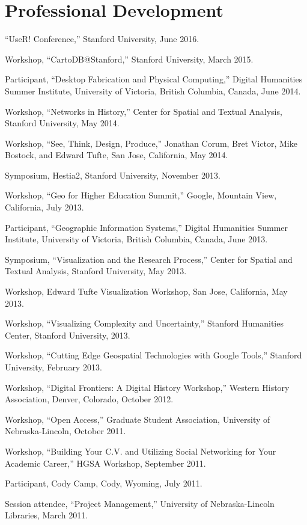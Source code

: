 \section{Professional Development}\label{professional-development}

``UseR! Conference,'' Stanford University, June 2016.

Workshop, ``CartoDB@Stanford,'' Stanford University, March 2015.

Participant, ``Desktop Fabrication and Physical Computing,'' Digital
Humanities Summer Institute, University of Victoria, British Columbia,
Canada, June 2014.

Workshop, ``Networks in History,'' Center for Spatial and Textual
Analysis, Stanford University, May 2014.

Workshop, ``See, Think, Design, Produce,'' Jonathan Corum, Bret Victor,
Mike Bostock, and Edward Tufte, San Jose, California, May 2014.

Symposium, Hestia2, Stanford University, November 2013.

Workshop, ``Geo for Higher Education Summit,'' Google, Mountain View,
California, July 2013.

Participant, ``Geographic Information Systems,'' Digital Humanities
Summer Institute, University of Victoria, British Columbia, Canada, June
2013.

Symposium, ``Visualization and the Research Process,'' Center for
Spatial and Textual Analysis, Stanford University, May 2013.

Workshop, Edward Tufte Visualization Workshop, San Jose, California, May
2013.

Workshop, ``Visualizing Complexity and Uncertainty,'' Stanford
Humanities Center, Stanford University, 2013.

Workshop, ``Cutting Edge Geospatial Technologies with Google Tools,''
Stanford University, February 2013.

Workshop, ``Digital Frontiers: A Digital History Workshop,'' Western
History Association, Denver, Colorado, October 2012.

Workshop, ``Open Access,'' Graduate Student Association, University of
Nebraska-Lincoln, October 2011.

Workshop, ``Building Your C.V. and Utilizing Social Networking for Your
Academic Career,'' HGSA Workshop, September 2011.

Participant, Cody Camp, Cody, Wyoming, July 2011.

Session attendee, ``Project Management,'' University of Nebraska-Lincoln
Libraries, March 2011.

